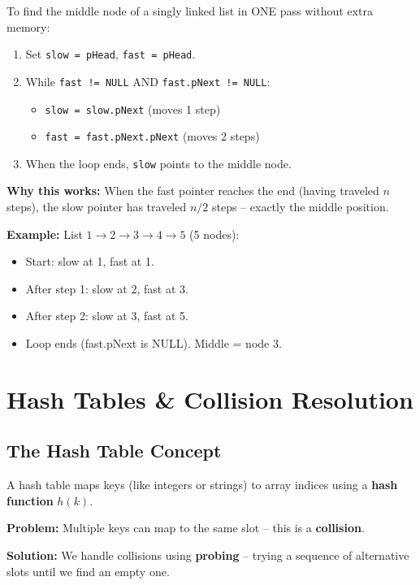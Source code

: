 \documentclass[12pt,portrait]{article}
\begin{document}
\begin{rulebox}
To find the middle node of a singly linked list in ONE pass without extra memory:

\begin{enumerate}[leftmargin=*]
    \item Set \texttt{slow = pHead}, \texttt{fast = pHead}.
    \item While \texttt{fast != NULL} AND \texttt{fast.pNext != NULL}:
    \begin{itemize}[leftmargin=*]
        \item \texttt{slow = slow.pNext} (moves 1 step)
        \item \texttt{fast = fast.pNext.pNext} (moves 2 steps)
    \end{itemize}
    \item When the loop ends, \texttt{slow} points to the middle node.
\end{enumerate}

\textbf{Why this works:} When the fast pointer reaches the end (having traveled $n$ steps), the slow pointer has traveled $n/2$ steps -- exactly the middle position.

\textbf{Example:} List $1 \to 2 \to 3 \to 4 \to 5$ (5 nodes):
\begin{itemize}[leftmargin=*]
    \item Start: slow at 1, fast at 1.
    \item After step 1: slow at 2, fast at 3.
    \item After step 2: slow at 3, fast at 5.
    \item Loop ends (fast.pNext is NULL). Middle = node 3.
\end{itemize}
\end{rulebox}

\section{Hash Tables \& Collision Resolution}
\label{sec:hashing}

\subsection{The Hash Table Concept}

\begin{rulebox}
A hash table maps keys (like integers or strings) to array indices using a \textbf{hash function} $h(k)$. 

\textbf{Problem:} Multiple keys can map to the same slot -- this is a \textbf{collision}.

\textbf{Solution:} We handle collisions using \textbf{probing} -- trying a sequence of alternative slots until we find an empty one.
\end{rulebox}
\end{document}

